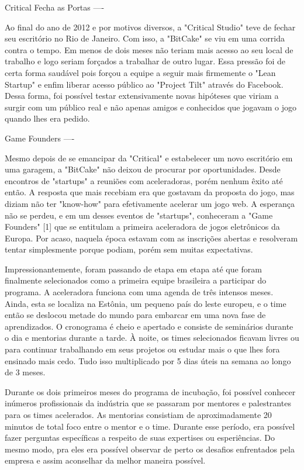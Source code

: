 Critical Fecha as Portas
----

Ao final do ano de 2012 e por motivos diversos, a "Critical Studio" teve de fechar seu escritório no Rio de Janeiro. Com isso, a "BitCake" se viu em uma corrida contra o tempo. Em menos de dois meses não teriam mais acesso ao seu local de trabalho e logo seriam forçados a trabalhar de outro lugar. Essa pressão foi de certa forma saudável pois forçou a equipe a seguir mais firmemente o "Lean Startup" e enfim liberar acesso público ao "Project Tilt" através do Facebook. Dessa forma, foi possível testar extensivamente novas hipóteses que viriam a surgir com um público real e não apenas amigos e conhecidos que jogavam o jogo quando lhes era pedido.


Game Founders
----

Mesmo depois de se emancipar da "Critical" e estabelecer um novo escritório em uma garagem, a "BitCake" não deixou de procurar por oportunidades. Desde encontros de "startups" a reuniões com aceleradoras, porém nenhum êxito até então. A resposta que mais recebiam era que gostavam da proposta do jogo, mas diziam não ter "know-how" para efetivamente acelerar um jogo web. A esperança não se perdeu, e em um desses eventos de "startups", conheceram a "Game Founders" [1] que se entitulam a primeira aceleradora de jogos eletrônicos da Europa. Por acaso, naquela época estavam com as inscrições abertas e resolveram tentar simplesmente porque podiam, porém sem muitas expectativas.

Impressionantemente, foram passando de etapa em etapa até que foram finalmente selecionados como a primeira equipe brasileira a participar do programa. A aceleradora funciona com uma agenda de três intensos meses. Ainda, esta se localiza na Estônia, um pequeno país do leste europeu, e o time então se deslocou metade do mundo para embarcar em uma nova fase de aprendizados. O cronograma é cheio e apertado e consiste de seminários durante o dia e mentorias durante a tarde. À noite, os times selecionados ficavam livres ou para continuar trabalhando em seus projetos ou estudar mais o que lhes fora ensinado mais cedo. Tudo isso multiplicado por 5 dias úteis na semana ao longo de 3 meses.

Durante os dois primeiros meses do programa de incubação, foi possível conhecer inúmeros profissionais da indústria que se passaram por mentores e palestrantes para os times acelerados. As mentorias consistiam de aproximadamente 20 minutos de total foco entre o mentor e o time. Durante esse período, era possível fazer perguntas específicas a respeito de suas expertises ou esperiências. Do mesmo modo, pra eles era possível observar de perto os desafios enfrentados pela empresa e assim aconselhar da melhor maneira possível.


